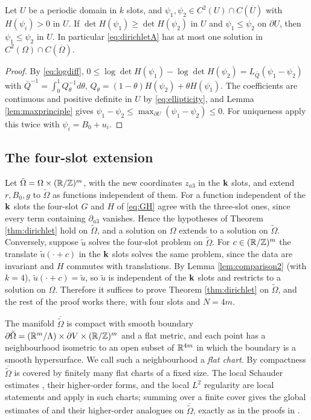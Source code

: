 \begin{lemma}[Comparison]\label{lem:comparison2}
Let $U$ be a periodic domain in $k$ slots, and $\psi_1,\psi_2\in C^2(U)\cap C(\overline U)$ with
$H(\psi_i)>0$ in $U$. If $\det H(\psi_1)\ge\det H(\psi_2)$ in $U$ and $\psi_1\le\psi_2$ on $\partial U$,
then $\psi_1\le\psi_2$ in $U$. In particular \eqref{eq:dirichletA} has at most one solution in
$C^2(\Omega)\cap C(\overline\Omega)$.
\end{lemma}

\begin{proof}
By \eqref{eq:logdiff}, $0\le\log\det H(\psi_1)-\log\det H(\psi_2)=L_{\bar Q}(\psi_1-\psi_2)$ with
$\bar Q^{-1}=\int_0^1Q_\theta^{-1}d\theta$, $Q_\theta=(1-\theta)H(\psi_2)+\theta H(\psi_1)$. The coefficients
are continuous and positive definite in $U$ by \eqref{eq:ellipticity}, and Lemma \ref{lem:maxprinciple}
gives $\psi_1-\psi_2\le\max_{\partial U}(\psi_1-\psi_2)\le0$. For uniqueness apply this twice with
$\psi_i=B_0+u_i$.
\end{proof}

\subsection{The four-slot extension}
Let $\tilde\Omega=\Omega\times(\mathbb{R}/\mathbb{Z})^m$, with the new coordinates $z_{a3}$ in the $\mathbf k$ slots, and extend
$r,B_0,g$ to $\tilde\Omega$ as functions independent of them. For a function independent of the $\mathbf k$
slots the four-slot $G$ and $H$ of \eqref{eq:GH} agree with the three-slot ones, since every term
containing $\partial_{a3}$ vanishes. Hence the hypotheses of Theorem \ref{thm:dirichlet} hold on
$\tilde\Omega$, and a solution on $\Omega$ extends to a solution on $\tilde\Omega$. Conversely, suppose
$\tilde u$ solves the four-slot problem on $\tilde\Omega$. For $c\in(\mathbb{R}/\mathbb{Z})^m$ the translate
$\tilde u(\cdot+c)$ in the $\mathbf k$ slots solves the same problem, since the data are invariant and
$H$ commutes with translations. By Lemma \ref{lem:comparison2} (with $k=4$), $\tilde u(\cdot+c)=\tilde u$,
so $\tilde u$ is independent of the $\mathbf k$ slots and restricts to a solution on $\Omega$. Therefore it
suffices to prove Theorem \ref{thm:dirichlet} on $\tilde\Omega$, and the rest of the proof works there,
with four slots and $N=4m$.

The manifold $\overline{\tilde\Omega}$ is compact with smooth boundary
$\partial\tilde\Omega=(\mathbb{R}^m/\Lambda)\times\partial V\times(\mathbb{R}/\mathbb{Z})^m$ and a flat metric, and each point has a
neighbourhood isometric to an open subset of $\mathbb{R}^{4m}$ in which the boundary is a smooth hypersurface.
We call such a neighbourhood a \emph{flat chart}. By compactness $\overline{\tilde\Omega}$ is covered by
finitely many flat charts of a fixed size. The local Schauder estimates \cite[Corollary 6.3 and Lemma
6.5]{GT01}, their higher-order forms, and the local $L^2$ regularity \cite[Theorems 8.8 and 8.12]{GT01}
are local statements and apply in such charts; summing over a finite cover gives the global estimates
of \cite[Theorem 6.6]{GT01} and their higher-order analogues on $\overline{\tilde\Omega}$, exactly as in
the proofs in \cite[Ch.~6]{GT01}.

